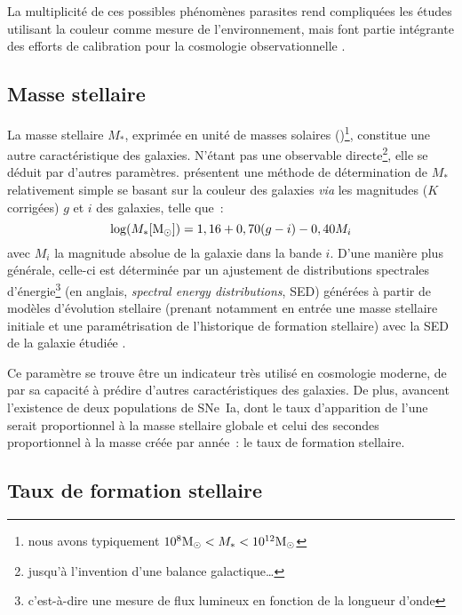 \documentclass[../main/main.tex]{subfiles}
\begin{document}
La multiplicité de ces possibles phénomènes parasites rend compliquées les
études utilisant la couleur comme mesure de l'environnement, mais font partie
intégrante des efforts de calibration pour la cosmologie observationnelle
\citep{fitzpatrick1999, schlafly2011, popovic2021b}.

\subsection{Masse stellaire}\label{ssec:mhost}

La masse stellaire $M_*$, exprimée en unité de masses
solaires (\si{\Msun})\footnote{nous avons typiquement $10^{8}\si{\Msun} <
M_* < 10^{12}\si{\Msun}$}, constitue une autre caractéristique des
galaxies. N'étant pas une observable directe\footnote{jusqu'à l'invention d'une
balance galactique…}, elle se déduit par d'autres paramètres. \cite{taylor2011}
présentent une méthode de détermination de $M_*$ relativement simple se basant
sur la couleur des galaxies \textit{via} les magnitudes ($K$ corrigées) $g$ et
$i$ des galaxies, telle que~:
\begin{equation}\label{eq:taylor}
    \log(M_* [\si{\Msun}]) = 1,16 + 0,70(g-i) -0,40 M_i
\end{equation}
avec $M_i$ la magnitude absolue de la galaxie dans la bande $i$. D'une manière
plus générale, celle-ci est déterminée par un ajustement de distributions
spectrales d'énergie\footnote{c'est-à-dire une mesure de flux lumineux en
fonction de la longueur d'onde} (en anglais, \textit{spectral energy
distributions}, SED) générées à partir de modèles d'évolution stellaire (prenant
notamment en entrée une masse stellaire initiale et une paramétrisation de
l'historique de formation stellaire) avec la SED de la galaxie étudiée
\citep{walcher2011}.

Ce paramètre se trouve être un indicateur très utilisé en cosmologie moderne, de
par sa capacité à prédire d'autres caractéristiques des galaxies. De plus,
\cite{mannucci2005, scannapieco2005} avancent l'existence de deux populations de
SNe~Ia, dont le taux d'apparition de l'une serait proportionnel à la masse
stellaire globale et celui des secondes proportionnel à la masse créée par
année~: le taux de formation stellaire.


\subsection{Taux de formation stellaire}\label{ssec:sfrhost}
\end{document}
